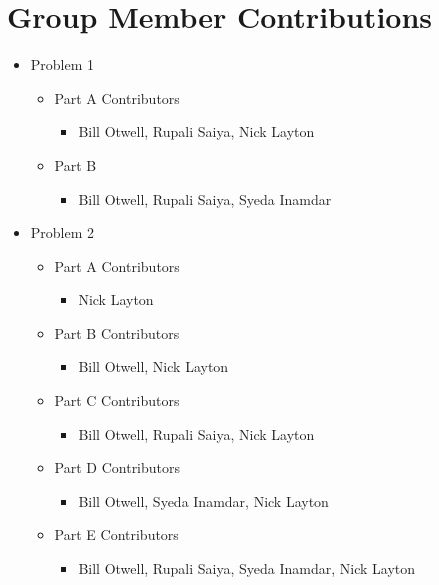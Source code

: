 \documentclass[11pt]{article}
\begin{document}
\section{Group Member Contributions}
\begin{itemize}
	\item Problem 1
	\begin{itemize}
		\item Part A Contributors
			\begin{itemize}
				\item Bill Otwell, Rupali Saiya, Nick Layton
			\end{itemize}
			
		\item Part B
			\begin{itemize}
				\item Bill Otwell, Rupali Saiya, Syeda Inamdar
			\end{itemize}
	\end{itemize}
	
	\item Problem 2
	\begin{itemize}
		\item Part A Contributors
			\begin{itemize}
				\item Nick Layton
			\end{itemize}
			
		\item Part B Contributors
			\begin{itemize}
				\item Bill Otwell, Nick Layton
			\end{itemize}
			
		\item Part C Contributors
			\begin{itemize}
				\item Bill Otwell, Rupali Saiya, Nick Layton
			\end{itemize}
			
		\item Part D Contributors
			\begin{itemize}
				\item Bill Otwell, Syeda Inamdar, Nick Layton
			\end{itemize}
			
		\item Part E Contributors
			\begin{itemize}
				\item Bill Otwell, Rupali Saiya, Syeda Inamdar, Nick Layton
			\end{itemize}
			

\end{itemize}
\end{itemize}
\end{document}
